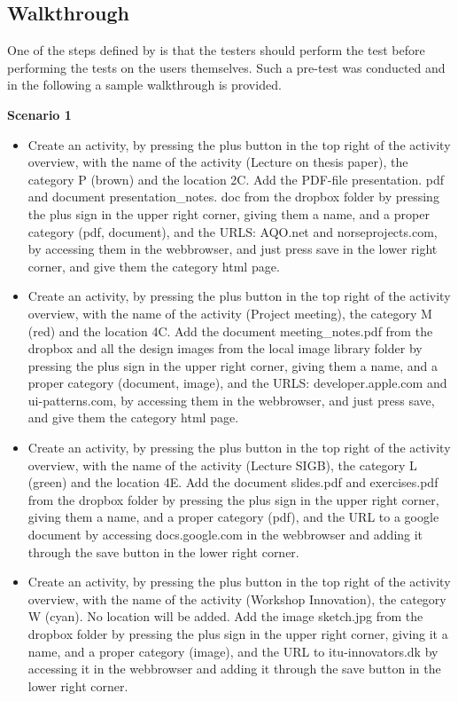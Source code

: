 \subsection{Walkthrough}
One of the steps defined by \citet{ugur2001} is that the testers should perform the test before performing the tests on the users themselves. Such a pre-test was conducted and in the following a sample walkthrough is provided.

\par\vspace{\baselineskip}

\textbf{Scenario 1}
\begin{itemize}
\item Create an activity, by pressing the plus button in the top right of the activity overview, with the name of the activity (Lecture on thesis paper), the category P (brown) and the location 2C. Add the PDF-file presentation. pdf and document presentation\_notes. doc from the dropbox folder by pressing the plus sign in the upper right corner, giving them a name, and a proper category (pdf, document), and the URLS: AQO.net and norseprojects.com, by accessing them in the webbrowser, and just press save in the lower right corner, and give them the category html page.
\item Create an activity, by pressing the plus button in the top right of the activity overview, with the name of the activity (Project meeting), the category M (red) and the location 4C. Add the document meeting\_notes.pdf from the dropbox and all the design images from the local image library folder by pressing the plus sign in the upper right corner, giving them a name, and a proper category (document, image), and the URLS: developer.apple.com and ui-patterns.com, by accessing them in the webbrowser, and just press save, and give them the category html page.
\item Create an activity, by pressing the plus button in the top right of the activity overview, with the name of the activity (Lecture SIGB), the category L (green) and the location 4E. Add the document slides.pdf and exercises.pdf from the dropbox folder by pressing the plus sign in the upper right corner, giving them a name, and a proper category (pdf), and the URL to a google document by accessing docs.google.com in the webbrowser and adding it through the save button in the lower right corner.
\item Create an activity, by pressing the plus button in the top right of the activity overview, with the name of the activity (Workshop Innovation), the category W (cyan). No location will be added. Add the image sketch.jpg from the dropbox folder by pressing the plus sign in the upper right corner, giving it a name, and a proper category (image), and the URL to itu-innovators.dk by accessing it in the webbrowser and adding it through the save button in the lower right corner.
\end{itemize}

